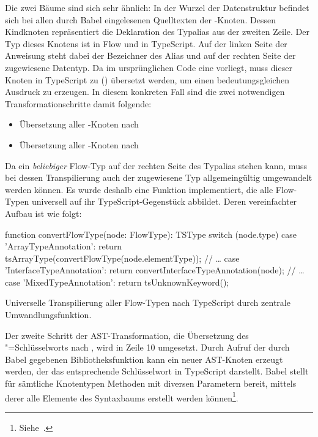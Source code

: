 {Die zwei Bäume sind sich sehr ähnlich: In der Wurzel der Datenstruktur befindet sich bei allen durch Babel eingelesenen Quelltexten der -Knoten. Dessen Kindknoten repräsentiert die Deklaration des Typalias aus der zweiten Zeile. Der Typ dieses Knotens ist  in Flow und  in TypeScript. Auf der linken Seite der Anweisung steht dabei der Bezeichner des Alias und auf der rechten Seite der zugewiesene Datentyp. Da im ursprünglichen Code eine  vorliegt, muss dieser Knoten in TypeScript zu  () übersetzt werden, um einen bedeutungsgleichen Ausdruck zu erzeugen. In diesem konkreten Fall sind die zwei notwendigen Transformationschritte damit folgende:

\begin{itemize}
  \item Übersetzung aller -Knoten nach 
  \item Übersetzung aller -Knoten nach 
\end{itemize}

Da ein \emph{beliebiger} Flow-Typ auf der rechten Seite des Typalias stehen kann, muss bei dessen Transpilierung auch der zugewiesene Typ allgemeingültig umgewandelt werden können. Es wurde deshalb eine Funktion implementiert, die alle Flow-Typen universell auf ihr TypeScript-Gegenstück abbildet. Deren vereinfachter Aufbau ist wie folgt:

\bigbreak
\begin{listing}[htb]
\begin{textcode}
function convertFlowType(node: FlowType): TSType {
  switch (node.type) {
    case 'ArrayTypeAnnotation':
      return tsArrayType(convertFlowType(node.elementType));
    // …
    case 'InterfaceTypeAnnotation':
      return convertInterfaceTypeAnnotation(node);
    // …
    case 'MixedTypeAnnotation':
      return tsUnknownKeyword();
  }
}
\end{textcode}
\listingvspace
\caption{Universelle Transpilierung aller Flow-Typen nach TypeScript durch zentrale Umwandlungsfunktion.}
\label{code:convert-flow-type}
\end{listing}

Der zweite Schritt der AST-Transformation, die Übersetzung des "=Schlüsselworts nach , wird in Zeile 10 umgesetzt. Durch Aufruf der durch Babel gegebenen Bibliotheksfunktion  kann ein neuer AST-Knoten erzeugt werden, der das entsprechende Schlüsselwort in TypeScript darstellt. Babel stellt für sämtliche Knotentypen Methoden mit diversen Parametern bereit, mittels derer alle Elemente des Syntaxbaums erstellt werden können\footnote{Siehe~\autocite{BABEL:TYPES}.}.

}
